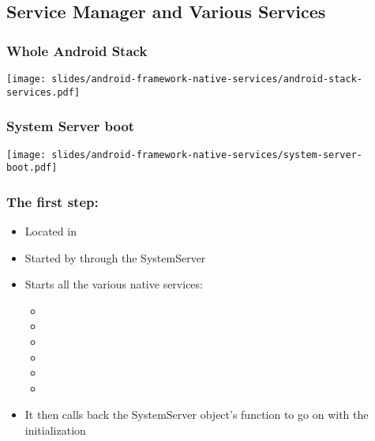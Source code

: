 \subsection{Service Manager and Various Services}

\begin{frame}
  \frametitle{Whole Android Stack}
  \begin{center}
    \texttt{[image: slides/android-framework-native-services/android-stack-services.pdf]}
  \end{center}
\end{frame}

\begin{frame}
  \frametitle{System Server boot}
  \begin{center}
    \texttt{[image: slides/android-framework-native-services/system-server-boot.pdf]}
  \end{center}
\end{frame}

\begin{frame}
  \frametitle{The first step: }
  \begin{itemize}
  \item Located in 
  \item Started by  through the SystemServer
  \item Starts all the various native services:
    \begin{itemize}
    \item {}
    \item {}
    \item {}
    \item {}
    \item {}
    \item {}
    \end{itemize}
  \item It then calls back the SystemServer object's  function to
    go on with the initialization
  \end{itemize}
\end{frame}

